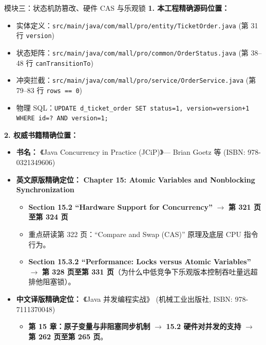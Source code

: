 \documentclass[a4paper,10pt]{ctexart}
\begin{document}
\begin{curriculumbox}{模块三：状态机防篡改、硬件 CAS 与乐观锁}
\textbf{1. 本工程精确源码位置：}
\begin{itemize}[leftmargin=1.2cm, noitemsep]
    \item 实体定义：\texttt{src/main/java/com/mall/pro/entity/TicketOrder.java} (第 31 行 \texttt{version})
    \item 状态矩阵：\texttt{src/main/java/com/mall/pro/common/OrderStatus.java} (第 38--48 行 \texttt{canTransitionTo})
    \item 冲突拦截：\texttt{src/main/java/com/mall/pro/service/OrderService.java} (第 79--83 行 \texttt{rows == 0})
    \item 物理 SQL：\texttt{UPDATE d\_ticket\_order SET status=1, version=version+1 WHERE id=? AND version=1;}
\end{itemize}

\textbf{2. 权威书籍精确位置：}
\begin{itemize}[leftmargin=1.2cm, noitemsep]
    \item \textbf{书名：} 《Java Concurrency in Practice (JCiP)》--- Brian Goetz 等 (ISBN: 978-0321349606)
    \item \textbf{英文原版精确定位：} \textbf{Chapter 15: Atomic Variables and Nonblocking Synchronization}
    \begin{itemize}
        \item \textbf{Section 15.2 ``Hardware Support for Concurrency''} $\rightarrow$ \textbf{第 321 页至第 324 页}
        \item 重点研读第 322 页：``Compare and Swap (CAS)'' 原理及底层 CPU 指令行为。
        \item \textbf{Section 15.3.2 ``Performance: Locks versus Atomic Variables''} $\rightarrow$ \textbf{第 328 页至第 331 页}（为什么中低竞争下乐观版本控制吞吐量远超排他阻塞锁）。
    \end{itemize}
    \item \textbf{中文译版精确定位：} 《Java 并发编程实战》 (机械工业出版社, ISBN: 978-7111370048)
    \begin{itemize}
        \item \textbf{第 15 章：原子变量与非阻塞同步机制} $\rightarrow$ \textbf{15.2 硬件对并发的支持} $\rightarrow$ \textbf{第 262 页至第 265 页}。
    \end{itemize}
\end{itemize}
\end{curriculumbox}
\end{document}
